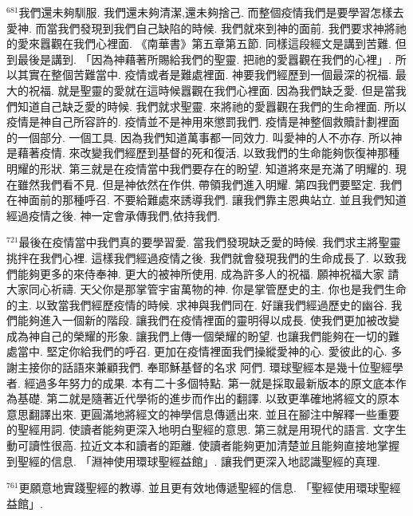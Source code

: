 \documentclass{book}
\begin{document}
$^{681}$我們還未夠馴服.
我們還未夠清潔,還未夠捨己.
而整個疫情我們是要學習怎樣去愛神.
而當我們發現到我們自己缺陷的時候.
我們就來到神的面前.
我們要求神將祂的愛來囂觀在我們心裡面.
《南華書》第五章第五節.
同樣這段經文是講到苦難.
但到最後是講到.
「因為神藉著所賜給我們的聖靈.
把祂的愛囂觀在我們的心裡」.
所以其實在整個苦難當中.
疫情或者是難處裡面.
神要我們經歷到一個最深的祝福.
最大的祝福.
就是聖靈的愛就在這時候囂觀在我們心裡面.
因為我們缺乏愛.
但是當我們知道自己缺乏愛的時候.
我們就求聖靈.
來將祂的愛囂觀在我們的生命裡面.
所以疫情是神自己所容許的.
疫情並不是神用來懲罰我們.
疫情是神整個救贖計劃裡面的一個部分.
一個工具.
因為我們知道萬事都一同效力.
叫愛神的人不亦存.
所以神是藉著疫情.
來改變我們經歷到基督的死和復活.
以致我們的生命能夠恢復神那種明耀的形狀.
第三就是在疫情當中我們要存在的盼望.
知道將來是充滿了明耀的.
現在雖然我們看不見.
但是神依然在作供.
帶領我們進入明耀.
第四我們要堅定.
我們在神面前的那種呼召.
不要給難處來誘導我們.
讓我們靠主恩典站立.
並且我們知道經過疫情之後.
神一定會承傳我們,依持我們.

$^{721}$最後在疫情當中我們真的要學習愛.
當我們發現缺乏愛的時候.
我們求主將聖靈挑拌在我們心裡.
這樣我們經過疫情之後.
我們就會發現我們的生命成長了.
以致我們能夠更多的來侍奉神.
更大的被神所使用.
成為許多人的祝福.
願神祝福大家 請大家同心祈禱.
天父你是那掌管宇宙萬物的神.
你是掌管歷史的主.
你也是我們生命的主.
以致當我們經歷疫情的時候.
求神與我們同在.
好讓我們經過歷史的幽谷.
我們能夠進入一個新的階段.
讓我們在疫情裡面的靈明得以成長.
使我們更加被改變成為神自己的榮耀的形象.
讓我們上傳一個榮耀的盼望.
也讓我們能夠在一切的難處當中.
堅定你給我們的呼召.
更加在疫情裡面我們操縱愛神的心.
愛彼此的心.
多謝主接你的話語來兼顧我們.
奉耶穌基督的名求 阿們.
環球聖經本是幾十位聖經學者.
經過多年努力的成果.
本有二十多個特點.
第一就是採取最新版本的原文底本作為基礎.
第二就是隨著近代學術的進步而作出的翻譯.
以致更準確地將經文的原本意思翻譯出來.
更圓滿地將經文的神學信息傳遞出來.
並且在腳注中解釋一些重要的聖經用詞.
使讀者能夠更深入地明白聖經的意思.
第三就是用現代的語言.
文字生動可讀性很高.
拉近文本和讀者的距離.
使讀者能夠更加清楚並且能夠直接地掌握到聖經的信息.
「淵神使用環球聖經益館」.
讓我們更深入地認識聖經的真理.

$^{761}$更願意地實踐聖經的教導.
並且更有效地傳遞聖經的信息.
「聖經使用環球聖經益館」.
\newpage
\end{document}
